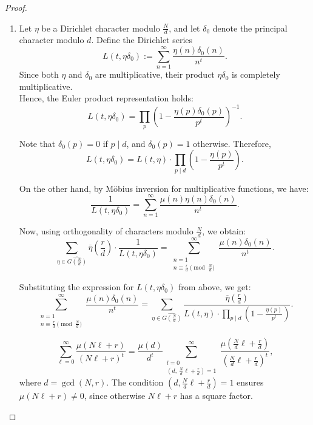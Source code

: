 \documentclass[10pt,a4paper]{amsart}
\begin{document}
\begin{proof}






\begin{enumerate}[label= \roman*)]

\item 

Let $\eta$ be a Dirichlet character modulo $\frac{N}{d}$, and let $\delta_0$ denote the principal character modulo $d$. Define the Dirichlet series
\[
L(t, \eta \delta_0) := \sum_{n=1}^\infty \frac{\eta(n) \delta_0(n)}{n^t}.
\]
Since both $\eta$ and $\delta_0$ are multiplicative, their product $\eta \delta_0$ is completely multiplicative. \\

Hence, the Euler product representation holds:
\[
L(t, \eta \delta_0) = \prod_p \left( 1 - \frac{\eta(p) \delta_0(p)}{p^t} \right)^{-1}.
\]


Note that $\delta_0(p) = 0$ if $p \mid d$, and $\delta_0(p) = 1$ otherwise. Therefore,
\[
L(t, \eta \delta_0) = L(t, \eta) \cdot \prod_{p \mid d} \left( 1 - \frac{\eta(p)}{p^t} \right).
\]


On the other hand, by M\"obius inversion for multiplicative functions, we have:
\[
\frac{1}{L(t, \eta \delta_0)} = \sum_{n=1}^\infty \frac{\mu(n) \eta(n) \delta_0(n)}{n^t}.
\]


Now, using orthogonality of characters modulo $\frac{N}{d}$, we obtain:
\[
\sum_{\eta \in \widehat{G\left( \frac{N}{d} \right)}} \overline{\eta}\left( \frac{r}{d} \right) \cdot \frac{1}{L(t, \eta \delta_0)} 
= \sum_{\substack{n=1 \\ n \equiv \frac{r}{d}\pmod{\frac{N}{d}}}}^\infty \frac{\mu(n) \delta_0(n)}{n^t}.
\]


Substituting the expression for $L(t, \eta \delta_0)$ from above, we get:
\[
\sum_{\substack{n=1 \\ n \equiv \frac{r}{d}\pmod{\frac{N}{d}}}}^\infty \frac{\mu(n) \delta_0(n)}{n^t}
= \sum_{\eta \in \widehat{G\left( \frac{N}{d} \right)}} 
\frac{ \overline{\eta}\left( \frac{r}{d} \right) }{ L(t, \eta) \cdot \displaystyle\prod_{p \mid d} \left( 1 - \frac{\eta(p)}{p^t} \right) }.
\]


\begin{equation*}
\sum_{\ell=0}^\infty \frac{\mu(N\ell + r)}{(N\ell + r)^t}
= \frac{\mu(d)}{d^t} \sum_{\substack{l=0 \\ (d,\, \frac{N}{d}\ell + \frac{r}{d}) = 1}}^\infty \frac{\mu\left( \frac{N}{d}\ell + \frac{r}{d} \right)}{\left( \frac{N}{d}\ell + \frac{r}{d} \right)^t},
\end{equation*}
where $d = \gcd(N,r)$. The condition $(d, \frac{N}{d}\ell + \frac{r}{d}) = 1$ ensures $\mu(N\ell + r) \ne 0$, since otherwise $N\ell + r$ has a square factor.



\end{enumerate}
\end{proof}
\end{document}
